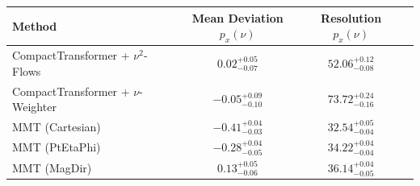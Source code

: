     \begin{tabular}{lccc}
        \toprule
        Method & Mean Deviation $p_{x}(\nu)$ & Resolution $p_{x}(\nu)$ \\
        \midrule
        CompactTransformer + $\nu^2$-Flows & $0.02^{+0.05}_{-0.07}$ & $52.06^{+0.12}_{-0.08}$ \\
        CompactTransformer + $\nu$-Weighter & $-0.05^{+0.09}_{-0.10}$ & $73.72^{+0.24}_{-0.16}$ \\
        MMT (Cartesian) & $-0.41^{+0.04}_{-0.03}$ & $32.54^{+0.05}_{-0.04}$ \\
        MMT (PtEtaPhi) & $-0.28^{+0.04}_{-0.05}$ & $34.22^{+0.04}_{-0.04}$ \\
        MMT (MagDir) & $0.13^{+0.05}_{-0.06}$ & $36.14^{+0.04}_{-0.05}$ \\
        \bottomrule
    \end{tabular}